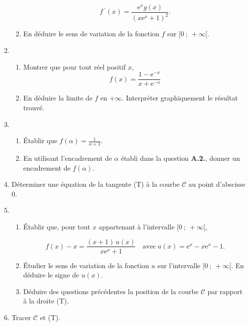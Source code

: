 \documentclass[a4paper, 11pt]{article}
\begin{document}
\begin{exercice}
\begin{enumerate}
\begin{enumerate}
\[f\,^{\prime}(x)=\frac{\text{e}^{x}g(x)}{(x\text{e}^{x}+1)^{2}}.\]
\item En déduire le sens de variation de la fonction $f$ sur
$[0~;~+\infty[$.
\end{enumerate}
\item
	\begin{enumerate}
		\item Montrer que pour tout réel positif $x$,
\[
f(x)=\frac{1- \text{e}^{-x}}{x+\text{e}^{-x}}%
\]
		\item En déduire la limite de $f$ en $+\infty$.
Interpréter graphiquement le résultat trouvé.
	\end{enumerate}
\item
	\begin{enumerate}
		\item Établir que $f(\alpha) = \displaystyle\frac{1}{\alpha+
1}$.
		\item En utilisant l'encadrement de $\alpha$ établi dans la
question \textbf{A.2.}, donner un encadrement de $f(\alpha)$.
	\end{enumerate}
\item Déterminer une équation de la tangente (T) à la
courbe $\mathcal{C}$ au point d'abscisse 0.
\item
	\begin{enumerate}
		\item Établir que, pour tout $x$ appartenant à
l'intervalle $[0~;~+\infty[$,

\[f(x)-x=\frac{(x+1)\,u(x)}{x\text{e}^{x}+1}\quad \text{avec}\: u(x) = \text{e}^{x} - x\text{e}^{x}-1.
\]
		\item Étudier le sens de variation de la fonction $u$ sur
l'intervalle $[0~;~+\infty[$. En déduire le signe de $u(x)$.
		\item Déduire des questions précédentes la position
de la courbe $\mathcal{C}$ par rapport à la droite (T).
	\end{enumerate}
\item Tracer $\mathcal{C}$ et (T).
\end{enumerate}



\end{exercice}
\end{document}
